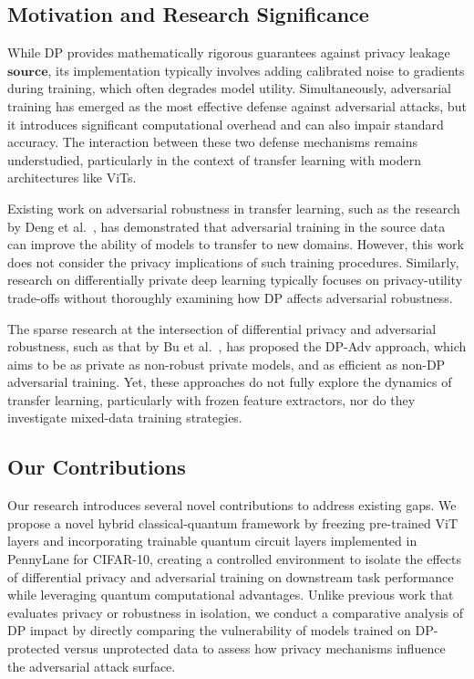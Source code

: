 \documentclass[11pt, conference]{IEEEtran}
\begin{document}
\subsection{Motivation and Research Significance}
While DP provides mathematically rigorous guarantees against privacy leakage  $\textbf{source}$, its implementation typically involves adding calibrated noise to gradients during training, which often degrades model utility. Simultaneously, adversarial training has emerged as the most effective defense against adversarial attacks, but it introduces significant computational overhead and can also impair standard accuracy. The interaction between these two defense mechanisms remains understudied, particularly in the context of transfer learning with modern architectures like ViTs. 

Existing work on adversarial robustness in transfer learning, such as the research by Deng et al.~\cite{deng2021}, has demonstrated that adversarial training in the source data can improve the ability of models to transfer to new domains. However, this work does not consider the privacy implications of such training procedures. Similarly, research on differentially private deep learning typically focuses on privacy-utility trade-offs without thoroughly examining how DP affects adversarial robustness.

The sparse research at the intersection of differential privacy and adversarial robustness, such as that by Bu et al.~\cite{bu2021}, has proposed the DP-Adv approach, which aims to be as private as non-robust private models, and as efficient as non-DP adversarial training. Yet, these approaches do not fully explore the dynamics of transfer learning, particularly with frozen feature extractors, nor do they investigate mixed-data training strategies.

\subsection{Our Contributions}

 Our research introduces several novel contributions to address existing gaps. We propose a novel hybrid classical-quantum framework by freezing pre-trained ViT layers and incorporating trainable quantum circuit layers implemented in PennyLane for CIFAR-10, creating a controlled environment to isolate the effects of differential privacy and adversarial training on downstream task performance while leveraging quantum computational advantages. Unlike previous work that evaluates privacy or robustness in isolation, we conduct a comparative analysis of DP impact by directly comparing the vulnerability of models trained on DP-protected versus unprotected data to assess how privacy mechanisms influence the adversarial attack surface. 
\end{document}
